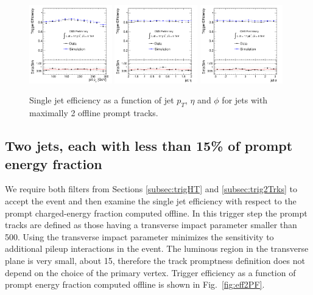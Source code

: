  
\begin{figure}[!h]
\centering
 \includegraphics[width=0.32\textwidth]{plots/trigger/effHT300_2Trk_Pt.pdf}
 \includegraphics[width=0.32\textwidth]{plots/trigger/effHT300_2Trk_Eta.pdf}
 \includegraphics[width=0.32\textwidth]{plots/trigger/effHT300_2Trk_Phi.pdf}
\caption{Single jet efficiency as a function of jet $p_T$, $\eta$ and $\phi$ for jets with maximally 2 offline prompt tracks. \label{fig:eff2Trksptetaphi}}
\end{figure}

\subsection{Two jets, each with less than 15\% of prompt energy fraction}
\label{subsec:trig2PF}

We require both filters from Sections \ref{subsec:trigHT} and \ref{subsec:trig2Trks} 
to accept the event and then
examine the single jet efficiency with respect to the prompt charged-energy
 fraction computed offline. In this trigger step the prompt tracks are defined
 as those having a transverse impact parameter smaller than 500\micron. 
Using the transverse impact parameter
minimizes the sensitivity to additional pileup interactions in the event. The luminous region in 
the transverse plane is very small, about 15\micron, therefore the track promptness definition does not depend on the choice of the primary vertex. 
Trigger efficiency as a function of prompt energy fraction computed offline is shown in Fig.~\ref{fig:eff2PF}.

